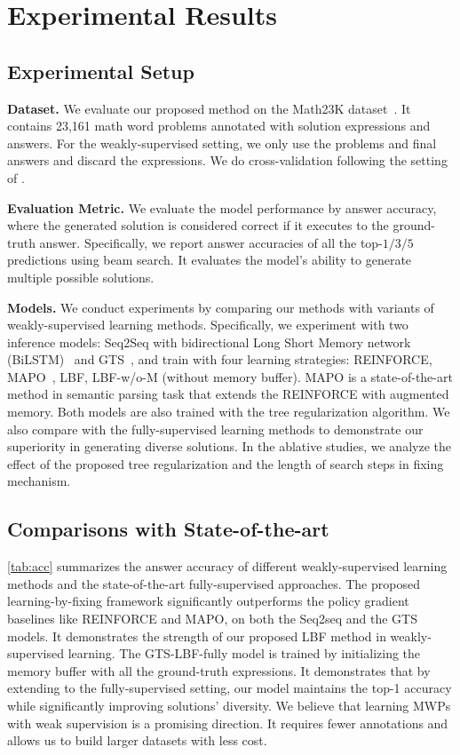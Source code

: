 \vspace{-7mm}
\section{Experimental Results} \label{sec:exp}
\subsection{Experimental Setup}
\noindent \textbf{Dataset.} We evaluate our proposed method on the Math23K dataset~\cite{wang-etal-2017-deep}. It contains 23,161 math word problems annotated with solution expressions and answers. For the weakly-supervised setting, we only use the problems and final answers and discard the expressions. We do cross-validation following the setting of \citet{Xie2019AGT}.




\noindent \textbf{Evaluation Metric.} We evaluate the model performance by answer accuracy, where the generated solution is considered correct if it executes to the ground-truth answer. Specifically, we report answer accuracies of all the top-$1/3/5$ predictions using beam search. It evaluates the model's ability to generate multiple possible solutions. 

\noindent \textbf{Models.} We conduct experiments by comparing our methods with variants of weakly-supervised learning methods. Specifically, we experiment with two inference models: Seq2Seq with bidirectional Long Short Memory network (BiLSTM)~\cite{Wu2016GooglesNM} and GTS~\cite{Xie2019AGT}, and train with four learning strategies: REINFORCE, MAPO~\cite{Liang2018MemoryAP}, LBF, LBF-w/o-M (without memory buffer). MAPO is a state-of-the-art method in semantic parsing task that extends the REINFORCE with augmented memory. Both models are also trained with the tree regularization algorithm. We also compare with the fully-supervised learning methods to demonstrate our superiority in generating diverse solutions. In the ablative studies, we analyze the effect of the proposed tree regularization and the length of search steps in fixing mechanism. 





\subsection{Comparisons with State-of-the-art}
\autoref{tab:acc} summarizes the answer accuracy of different weakly-supervised learning methods and the state-of-the-art fully-supervised approaches. The proposed learning-by-fixing framework significantly outperforms the policy gradient baselines like REINFORCE and MAPO, on both the Seq2seq and the GTS models. It demonstrates the strength of our proposed LBF method in weakly-supervised learning.  The GTS-LBF-fully model is trained by initializing the memory buffer with all the ground-truth expressions. It demonstrates that by extending to the fully-supervised setting, our model maintains the top-1 accuracy while significantly improving solutions' diversity. We believe that learning MWPs with weak supervision is a promising direction. It requires fewer annotations and allows us to build larger datasets with less cost.

